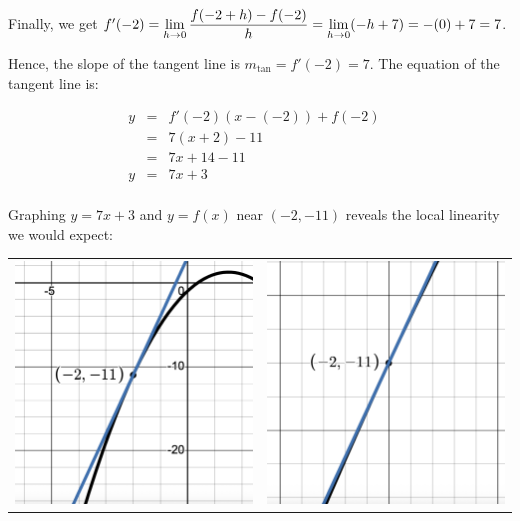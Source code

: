 \documentclass{ximera}
\begin{document}
\begin{example}
\begin{enumerate}
Finally, we get $ f'(-2) = \ds{\lim_{h \rightarrow 0} \dfrac{f(-2+h) - f(-2)}{h} = \lim_{h \rightarrow 0} (-h+7) = -(0) + 7 = 7}$.

\bigskip

Hence, the slope of the tangent line is $m_{\text{tan}} = f'(-2) = 7$.  The equation of the tangent line is: 

\[ \begin{array}{rclr}  
 y & = & f'(-2)(x - (-2)) + f(-2) & \\ 
  & = & 7(x+2) - 11 & \\
 & = & 7x+14 - 11& \\
  y & = & 7x+3& \\
 \end{array} \]

Graphing $y = 7x+3$ and $y = f(x)$ near $(-2,-11)$ reveals the local linearity we would expect:

\begin{center}

\begin{tabular}{cc}

 \includegraphics[width=2.5in]{./IntroductiontoDerivativesGraphics/TLEx.png} &  \includegraphics[width=2.5in]{./IntroductiontoDerivativesGraphics/TLExZoom.png}  \\
 

\end{tabular}
\end{center}
\end{enumerate}
\end{example}
\end{document}
